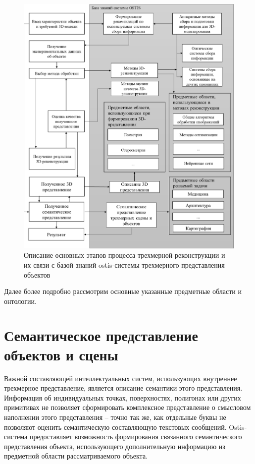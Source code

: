 \begin{figure}[H]
    \includegraphics[scale=0.3]{author/part4/figures/schema3D.png}
    \caption{Описание основных этапов процесса трехмерной реконструкции и их связи с базой знаний ostis-системы трехмерного представления объектов}
    \label{fig:schema-3d-reconstruction}
\end{figure}

Далее более подробно рассмотрим основные указанные предметные области и онтологии.

\section{Семантическое представление объектов и сцены}
\label{sec_3d_models_semantics}

Важной составляющей интеллектуальных систем, использующих внутреннее трехмерное представление, является описание семантики этого представления. Информация об индивидуальных точках, поверхностях, полигонах или других примитивах не позволяет сформировать комплексное представление о смысловом наполнении этого представления -- точно так же, как отдельные буквы не позволяют оценить семантическую составляющую текстовых сообщений. Ostis-система предоставляет возможность формирования связанного семантического представления объекта, использующего дополнительную информацию из предметной области рассматриваемого объекта.

